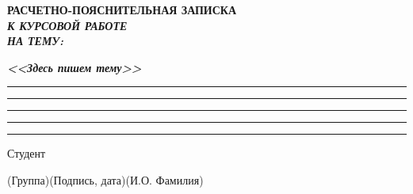 \documentclass[14pt, russian]{scrartcl}
\begin{document}
\sloppy


\begin{titlepage}
\thispagestyle{empty}
\newpage

\bmstuheader
 
 
\vspace{3em}
 
\begin{center}
\Large \bf{РАСЧЕТНО-ПОЯСНИТЕЛЬНАЯ ЗАПИСКА\\\textbf{\textit{К КУРСОВОЙ РАБОТЕ\\НА ТЕМУ:}} \\}
\end{center}

\vspace*{-6ex} 
\begin{center}
\Large{\textit{\textbf{<<Здесь пишем тему>>}}}

\vspace*{-3ex}
\rule{0.9\textwidth}{1.2pt}

\vspace*{-0.2ex}
\rule{0.9\textwidth}{1.2pt}

\vspace*{-0.2ex}
\rule{0.9\textwidth}{1.2pt}

\vspace*{-0.2ex}
\rule{0.9\textwidth}{1.2pt}

\vspace*{-0.2ex}
\rule{0.9\textwidth}{1.2pt}
\end{center}
 
\vspace{\fill}
 

\newlength{\ML}

\noindent Студент \underline{\hspace{1.5cm}} \hfill \underline{\hspace{4cm}}\quad
\underline{\hspace{4cm}}

\vspace{-2.1ex}
\noindent\hspace{9ex}\scriptsize{(Группа)}\normalsize\hspace{170pt}\hspace{2ex}\scriptsize{(Подпись, дата)}\normalsize\hspace{30pt}\hspace{6ex}\scriptsize{(И.О. Фамилия)}\normalsize


\end{titlepage}
\end{document}
